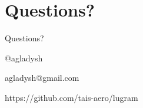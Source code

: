 \documentclass[aspectratio=43,handout,bigger]{beamer}
\begin{document}

\section{Questions?}


\begin{frame}[plain]{Questions?}

\begin{center}
\Huge{@agladysh}
\end{center}

\begin{center}
\Large{agladysh@gmail.com}
\end{center}

\begin{center}
https://github.com/tais-aero/lugram
\end{center}

\end{frame}

\end{document}
